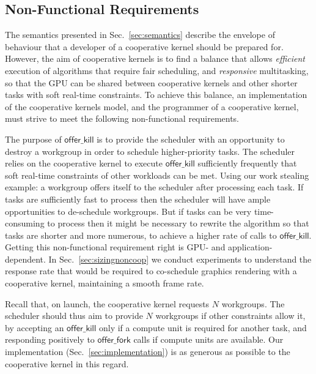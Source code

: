\documentclass[numbers,nocopyrightspace,10pt]{sigplanconf}
\newcommand{\mysec}{Sec.~}
\newcommand{\offerfork}{\mathsf{offer\_fork}}
\newcommand{\offerkill}{\mathsf{offer\_kill}}
\begin{document}
\subsection{Non-Functional Requirements}\label{sec:nonfunctional}

The semantics presented in \mysec\ref{sec:semantics} describe the envelope of
behaviour that a developer of a cooperative kernel should be prepared
for.
%
However, the aim of cooperative kernels is to find a balance that
allows \emph{efficient} execution of algorithms that require fair scheduling, and
\emph{responsive} multitasking, so that the GPU can be shared between
cooperative kernels and other shorter tasks with soft real-time constraints.
%
To achieve this balance, an implementation of the cooperative
kernels model, and the programmer of a cooperative kernel, must strive
to meet the following non-functional requirements.


The purpose of $\offerkill$ is to provide the scheduler with an
opportunity to destroy a workgroup in order to schedule
higher-priority tasks.  The scheduler relies on the cooperative kernel
to execute $\offerkill$ sufficiently frequently that soft real-time
constraints of other workloads can be met.
%
Using our work stealing example: a workgroup offers itself to
the scheduler after processing each task.  If tasks are sufficiently
fast to process then the scheduler will have ample opportunities to
de-schedule workgroups.  But if tasks can be very time-consuming to
process then it might be necessary to rewrite the algorithm so that
tasks are shorter and more numerous, to achieve a higher rate of calls
to $\offerkill$.
%
Getting this non-functional requirement right is GPU- and application-dependent.
In \mysec\ref{sec:sizingnoncoop} we conduct
experiments to understand the response rate that would be required to
co-schedule graphics rendering with a cooperative kernel, maintaining a smooth frame rate.


Recall that, on launch, the cooperative kernel requests $N$ workgroups.
The scheduler should thus aim to provide $N$ workgroups if other constraints allow it,
by accepting an $\offerkill$ only if a compute unit is required for another
task, and responding positively to $\offerfork$ calls if compute units are available.  Our
implementation (\mysec\ref{sec:implementation}) is as
generous as possible to the cooperative kernel in this regard.
\end{document}
